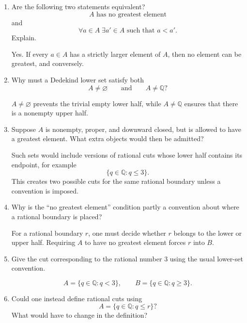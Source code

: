 \documentclass{self-check}
\begin{document}
\begin{enumerate}[label=\arabic*., itemsep=10pt]
\item Are the following two statements equivalent?
\[
\text{$A$ has no greatest element}
\]
and
\[
\forall a\in A\;\exists a'\in A\text{ such that }a<a'.
\]
Explain.

\begin{answer}
Yes. If every $a\in A$ has a strictly larger element of $A$, then no element can be greatest, and conversely.
\end{answer}

\item Why must a Dedekind lower set satisfy both
\[
A\neq\varnothing
\qquad\text{and}\qquad
A\neq\mathbb{Q}?
\]

\begin{answer}
$A\neq\varnothing$ prevents the trivial empty lower half, while $A\neq\mathbb{Q}$ ensures that there is a nonempty upper half.
\end{answer}

\item Suppose $A$ is nonempty, proper, and downward closed, but is allowed to have a greatest element.
What extra objects would then be admitted?

\begin{answer}
Such sets would include versions of rational cuts whose lower half contains its endpoint, for example
\[
\{q\in\mathbb{Q}:q\le 3\}.
\]
This creates two possible cuts for the same rational boundary unless a convention is imposed.
\end{answer}

\item Why is the ``no greatest element'' condition partly a convention about where a rational boundary is placed?

\begin{answer}
For a rational boundary $r$, one must decide whether $r$ belongs to the lower or upper half. Requiring $A$ to have no greatest element forces $r$ into $B$.
\end{answer}

\item Give the cut corresponding to the rational number $3$ using the usual lower-set convention.

\begin{answer}
\[
A=\{q\in\mathbb{Q}:q<3\},\qquad
B=\{q\in\mathbb{Q}:q\ge 3\}.
\]
\end{answer}

\item Could one instead define rational cuts using
\[
A=\{q\in\mathbb{Q}:q\le r\}?
\]
What would have to change in the definition?


\end{enumerate}
\end{document}
